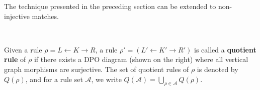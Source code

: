 
The technique presented in the preceding section can be extended to non-injective matches. 

\begin{definition} 
    \ \newline 
    \noindent
    \begin{minipage}{0.7\textwidth}
        Given a rule $\rho = L \leftarrow K \rightarrow R$, a rule $\rho' = (L' \leftarrow K' \rightarrow R')$ is called a \textbf{quotient rule} of $\rho$ if there exists a DPO diagram (shown on the right)
    where all vertical graph morphisms are surjective. The set of quotient rules of $\rho$ is denoted by $Q(\rho)$, and 
    for a rule set $\mathcal{A}$, we write $Q(\mathcal{A}) = \bigcup_{\rho\in\mathcal{A}} Q(\rho)$.
    \end{minipage}
    \hfill
    \begin{minipage}{0.29\textwidth}
        \hfill
    \end{minipage}
\end{definition}

